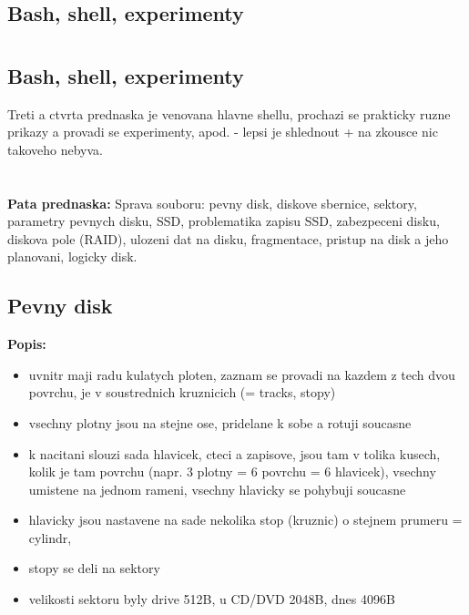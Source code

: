 \documentclass[a4paper, 11pt]{article}
\begin{document}
\section{}
\subsection{Bash, shell, experimenty}
\section{}
\subsection{Bash, shell, experimenty}
Treti a ctvrta prednaska je venovana hlavne shellu, prochazi se prakticky ruzne prikazy a provadi se experimenty, apod. - lepsi je shlednout + na zkousce nic takoveho nebyva.

\newpage

\section{}
\textbf{Pata prednaska:} Sprava souboru: pevny disk, diskove sbernice, sektory, parametry pevnych disku, SSD, problematika zapisu SSD, zabezpeceni disku, diskova pole (RAID), ulozeni dat na disku, fragmentace, pristup na disk a jeho planovani, logicky disk.
\subsection{Pevny disk}
\textbf{Popis:}
\begin{itemize}
    \item uvnitr maji radu kulatych ploten, zaznam se provadi na kazdem z tech dvou povrchu, je v soustrednich kruznicich (= tracks, stopy)
    \item vsechny plotny jsou na stejne ose, pridelane k sobe a rotuji soucasne
    \item k nacitani slouzi sada hlavicek, cteci a zapisove, jsou tam v tolika kusech, kolik je tam povrchu (napr. 3 plotny = 6 povrchu = 6 hlavicek), vsechny umistene na jednom rameni, vsechny hlavicky se pohybuji soucasne
    \item hlavicky jsou nastavene na sade nekolika stop (kruznic) o stejnem prumeru = cylindr,
    \item stopy se deli na sektory
    \item velikosti sektoru byly drive 512B, u CD/DVD 2048B, dnes 4096B \\
\end{itemize}
\end{document}
